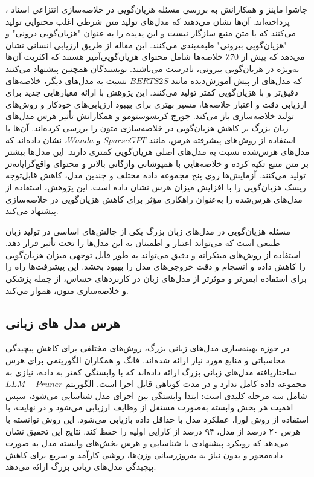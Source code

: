 ، جاشوا ماینز و همکارانش به بررسی مسئله هزیان‌گویی در خلاصه‌سازی انتزاعی اسناد پرداخته‌اند. آن‌ها نشان می‌دهند که مدل‌های تولید متن شرطی اغلب محتوایی تولید می‌کنند که با متن منبع سازگار نیست و این پدیده را به عنوان "هزیان‌گویی درونی" و "هزیان‌گویی بیرونی" طبقه‌بندی می‌کنند. این مقاله از طریق ارزیابی انسانی نشان می‌دهد که بیش از 70٪ خلاصه‌ها شامل محتوای هزیان‌گویی‌آمیز هستند که اکثریت آن‌ها به‌ویژه در هزیان‌گویی بیرونی، نادرست می‌باشند. نویسندگان همچنین پیشنهاد می‌کنند که مدل‌های از پیش آموزش‌دیده مانند $BERTS2S$ نسبت به مدل‌های دیگر، خلاصه‌های دقیق‌تر و با هزیان‌گویی کمتر تولید می‌کنند. این پژوهش با ارائه معیارهایی جدید برای ارزیابی دقت و اعتبار خلاصه‌ها، مسیر بهتری برای بهبود ارزیابی‌های خودکار و روش‌های تولید خلاصه‌سازی باز می‌کند​\cite{maynez-etal-2020-faithfulness}.
 جورج کریسوستومو و همکارانش تأثیر هرس مدل‌های زبان بزرگ بر کاهش هزیان‌گویی در خلاصه‌سازی متون را بررسی کرده‌اند. آن‌ها با استفاده از روش‌های پیشرفته هرس، مانند $SparseGPT$ و $Wanda$، نشان داده‌اند که مدل‌های هرس‌شده نسبت به مدل‌های اصلی هزیان‌گویی کمتری دارند. این مدل‌ها بیشتر بر متن منبع تکیه کرده و خلاصه‌هایی با همپوشانی واژگانی بالاتر و محتوای واقع‌گرایانه‌تر تولید می‌کنند. آزمایش‌ها روی پنج مجموعه داده مختلف و چندین مدل، کاهش قابل‌توجه ریسک هزیان‌گویی را با افزایش میزان هرس نشان داده است. این پژوهش، استفاده از مدل‌های هرس‌شده را به‌عنوان راهکاری مؤثر برای کاهش هزیان‌گویی در خلاصه‌سازی پیشنهاد می‌کند.
 
مسئله هزیان‌گویی در مدل‌های زبان بزرگ یکی از چالش‌های اساسی در تولید زبان طبیعی است که می‌تواند اعتبار و اطمینان به این مدل‌ها را تحت تأثیر قرار دهد. استفاده از روش‌های مبتکرانه و دقیق می‌تواند به طور قابل توجهی میزان هزیان‌گویی را کاهش داده و انسجام و دقت خروجی‌های مدل را بهبود بخشد. این پیشرفت‌ها راه را برای استفاده ایمن‌تر و موثرتر از مدل‌های زبان در کاربردهای حساس، از جمله پزشکی و خلاصه‌سازی متون، هموار می‌کند.

\subsection{هرس مدل های زبانی}

در حوزه بهینه‌سازی مدل‌های زبانی بزرگ، روش‌های مختلفی برای کاهش پیچیدگی محاسباتی و منابع مورد نیاز ارائه شده‌اند.
فانگ و همکاران الگوریتمی برای هرس ساختاریافته مدل‌های زبانی بزرگ ارائه داده‌اند که با وابستگی کمتر به داده، نیازی به مجموعه داده کامل ندارد و در مدت کوتاهی قابل اجرا است. الگوریتم $LLM-Pruner$ شامل سه مرحله کلیدی است: ابتدا وابستگی بین اجزای مدل شناسایی می‌شود، سپس اهمیت هر بخش وابسته به‌صورت مستقل از وظایف  ارزیابی می‌شود و در نهایت، با استفاده از روش لورا، عملکرد مدل با حداقل داده بازیابی می‌شود. این روش توانسته با هرس ۲۰ درصد از مدل، ۹۴ درصد از کارایی اولیه را حفظ کند. نتایج این تحقیق نشان می‌دهد که رویکرد پیشنهادی با شناسایی و هرس بخش‌های وابسته مدل به صورت داده‌محور و بدون نیاز به به‌روزرسانی وزن‌ها، روشی کارآمد و سریع برای کاهش پیچیدگی مدل‌های زبانی بزرگ ارائه می‌دهد\cite{men2024shortgpt}.


